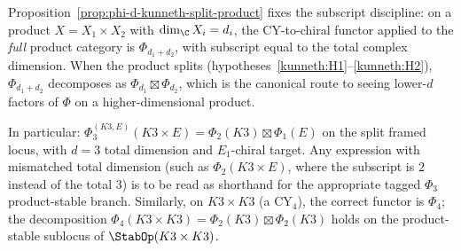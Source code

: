 \begin{remark}
\label{rem:phi-subscript-discipline}
Proposition~\ref{prop:phi-d-kunneth-split-product} fixes the subscript discipline: on a product $X = X_1 \times X_2$ with $\dim_\C X_i = d_i$, the CY-to-chiral functor applied to the \emph{full} product category is $\Phi_{d_1+d_2}$, with subscript equal to the total complex dimension. When the product splits \textup{(}hypotheses~\ref{kunneth:H1}--\ref{kunneth:H2}\textup{),} $\Phi_{d_1+d_2}$ decomposes as $\Phi_{d_1} \boxtimes \Phi_{d_2}$, which is the canonical route to seeing lower-$d$ factors of $\Phi$ on a higher-dimensional product.

In particular: $\Phi_3^{(K3,E)}(K3 \times E) = \Phi_2(K3) \boxtimes \Phi_1(E)$ on the split framed locus, with $d = 3$ total dimension and $E_1$-chiral target. Any expression with mismatched total dimension (such as $\Phi_2(K3 \times E)$, where the subscript is $2$ instead of the total $3$) is to be read as shorthand for the appropriate tagged $\Phi_3$ product-stable branch. Similarly, on $K3 \times K3$ \textup{(}a CY$_4$\textup{),} the correct functor is $\Phi_4$; the decomposition $\Phi_4(K3 \times K3) = \Phi_2(K3) \boxtimes \Phi_2(K3)$ holds on the product-stable sublocus of $\StabOp(K3 \times K3)$.
\end{remark}

